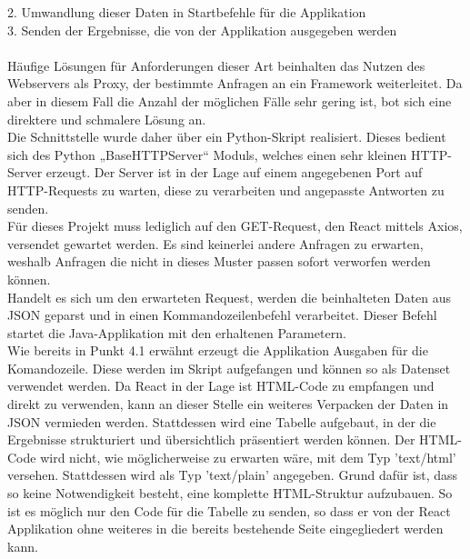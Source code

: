 2. Umwandlung dieser Daten in Startbefehle für die Applikation\\

3. Senden der Ergebnisse, die von der Applikation ausgegeben werden\\\\
Häufige Lösungen für Anforderungen dieser Art beinhalten das Nutzen des Webservers als Proxy, der bestimmte Anfragen an ein Framework weiterleitet. Da aber in diesem Fall die Anzahl der möglichen Fälle sehr gering ist, bot sich eine direktere und schmalere Lösung an.\\
Die Schnittstelle wurde daher über ein Python-Skript realisiert. Dieses bedient sich des Python „BaseHTTPServer“ Moduls, welches einen sehr kleinen HTTP-Server erzeugt. Der Server ist in der Lage auf einem angegebenen Port auf HTTP-Requests zu warten, diese zu verarbeiten und angepasste Antworten zu senden. \\
Für dieses Projekt muss lediglich auf den GET-Request, den React mittels Axios, versendet gewartet werden. Es sind keinerlei andere Anfragen zu erwarten, weshalb Anfragen die nicht in dieses Muster passen sofort verworfen werden können.\\
Handelt es sich um den erwarteten Request, werden die beinhalteten Daten aus JSON geparst und in einen Kommandozeilenbefehl verarbeitet. Dieser Befehl startet die Java-Applikation mit den erhaltenen Parametern.\\
Wie bereits in Punkt 4.1 erwähnt erzeugt die Applikation Ausgaben für die Komandozeile. Diese werden im Skript aufgefangen und können so als Datenset verwendet werden. Da React in der Lage ist HTML-Code zu empfangen und direkt zu verwenden, kann an dieser Stelle ein weiteres Verpacken der Daten in JSON vermieden werden. Stattdessen wird eine Tabelle aufgebaut, in der die Ergebnisse strukturiert und übersichtlich präsentiert werden können. Der HTML-Code wird nicht, wie möglicherweise zu erwarten wäre, mit dem Typ 'text/html' versehen. Stattdessen wird als Typ 'text/plain' angegeben. Grund dafür ist, dass so keine Notwendigkeit besteht, eine komplette HTML-Struktur aufzubauen. So ist es möglich nur den Code für die Tabelle zu senden, so dass er von der React Applikation ohne weiteres in die bereits bestehende Seite eingegliedert werden kann.
